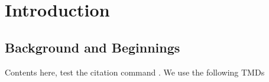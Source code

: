 \chapter{Introduction}\label{chap:intro}
\section{Background and Beginnings}\label{sec:background_begin}

Contents here, test the citation command \cite{Huang_et_al_ACSnano2015}. We use the following TMDs  \cite{Schroder_Semiconductor2006, Lee_et_al_ACSnano2015}